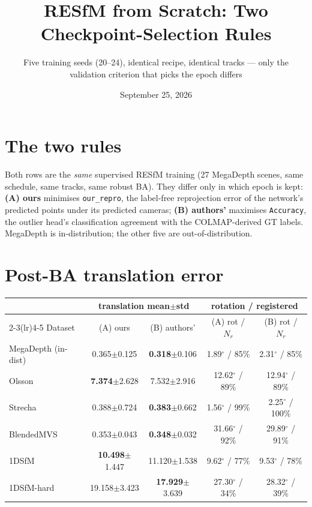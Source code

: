 \documentclass[11pt]{article}
\title{RESfM from Scratch: Two Checkpoint-Selection Rules}
\author{Five training seeds (20--24), identical recipe, identical tracks --- only the
validation criterion that picks the epoch differs}\date{September 25, 2026}
\begin{document}
\maketitle
\section*{The two rules}
Both rows are the \emph{same} supervised RESfM training (27 MegaDepth scenes, same
schedule, same tracks, same robust BA). They differ only in which epoch is kept:
\textbf{(A) ours} minimises \texttt{our\_repro}, the label-free reprojection error of the
network's predicted points under its predicted cameras; \textbf{(B) authors'} maximises
\texttt{Accuracy}, the outlier head's classification agreement with the COLMAP-derived
GT labels. MegaDepth is in-distribution; the other five are out-of-distribution.
\section*{Post-BA translation error}
\begin{center}\begin{tabular}{lcccc}
\toprule
& \multicolumn{2}{c}{translation mean$\pm$std} & \multicolumn{2}{c}{rotation / registered}\\
\cmidrule(lr){2-3}\cmidrule(lr){4-5}
Dataset & (A) ours & (B) authors' & (A) rot / $N_r$ & (B) rot / $N_r$\\
\midrule
MegaDepth (in-dist) & 0.365$\pm$0.125 & \textbf{0.318}$\pm$0.106 & 1.89$^\circ$ / 85\% & 2.31$^\circ$ / 85\%\\
Olsson & \textbf{7.374}$\pm$2.628 & 7.532$\pm$2.916 & 12.62$^\circ$ / 89\% & 12.94$^\circ$ / 89\%\\
Strecha & 0.388$\pm$0.724 & \textbf{0.383}$\pm$0.662 & 1.56$^\circ$ / 99\% & 2.25$^\circ$ / 100\%\\
BlendedMVS & 0.353$\pm$0.043 & \textbf{0.348}$\pm$0.032 & 31.66$^\circ$ / 92\% & 29.89$^\circ$ / 91\%\\
1DSfM & \textbf{10.498}$\pm$1.447 & 11.120$\pm$1.538 & 9.62$^\circ$ / 77\% & 9.53$^\circ$ / 78\%\\
1DSfM-hard & 19.158$\pm$3.423 & \textbf{17.929}$\pm$3.639 & 27.30$^\circ$ / 34\% & 28.32$^\circ$ / 39\%\\
\bottomrule\end{tabular}\end{center}
\end{document}
